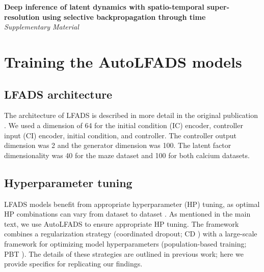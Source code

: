 \documentclass{article}
\begin{document}
\begin{center}
  \Large\textbf{Deep inference of latent dynamics with spatio-temporal super-resolution using selective backpropagation through time} \\
  \Large\textit{Supplementary Material}
\end{center}

\section{Training the AutoLFADS models}

\subsection{LFADS architecture}
The architecture of LFADS is described in more detail in the original publication \cite{pandarinath2018inferring}. We used a dimension of 64 for the initial condition (IC) encoder, controller input (CI) encoder, initial condition, and controller. The controller output dimension was 2 and the generator dimension was 100. The latent factor dimensionality was 40 for the maze dataset and 100 for both calcium datasets.

\subsection{Hyperparameter tuning}

LFADS models benefit from appropriate hyperparameter (HP) tuning, as optimal HP combinations can vary from dataset to dataset \cite{keshtkaran2019enabling, keshtkaran2021large}. As mentioned in the main text, we use AutoLFADS \cite{keshtkaran2021large} to ensure appropriate HP tuning. The framework combines a regularization strategy (coordinated dropout; CD \cite{keshtkaran2019enabling}) with a large-scale framework for optimizing model hyperparameters (population-based training; PBT \cite{jaderberg2017population}). The details of these strategies are outlined in previous work; here we provide specifics for replicating our findings.
\end{document}
